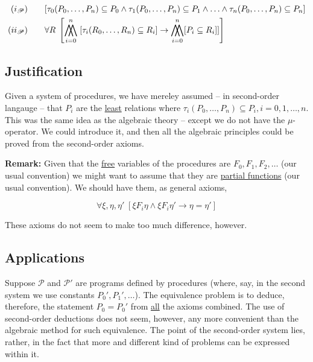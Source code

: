 \documentclass{article}
\DeclareMathOperator*{\bigdoublewedge}{\bigwedge\mkern-15mu\bigwedge}
\newcommand{\scP}{\mathscr{P}}
\begin{document}
\begin{align*}
    (i_\scP) \quad\quad & [\tau_0(P_0, \ldots, P_n) \subseteq P_0  \wedge \tau_1(P_0, \ldots, P_n) \subseteq P_1  \wedge \ldots \wedge \tau_n(P_0, \ldots, P_n) \subseteq P_n] \\
    (ii_\scP) \quad\quad &\forall R \; \left[ \bigdoublewedge\limits_{i=0}^n \; [\tau_i (R_0, \ldots, R_n) \subseteq R_i ] \to \bigdoublewedge\limits_{i=0}^n [P_i \subseteq R_i]] \right]
\end{align*}

\subsection{Justification}
Given a system of procedures, we have mereley assumed -- in second-order langauge -- that $P_i$ are the \underline{least} relations where $\tau_i(P_0, \ldots, P_n) \subseteq P_i, i=0,1,\ldots,n$. This was the same idea as the algebraic theory -- except we do not have the $\mu$-operator. We could introduce it, and then all the algebraic principles could be proved from the second-order axioms. 

\textbf{Remark:} Given that the \underline{free} variables of the procedures are $F_0, F_1, F_2, \ldots$ (our usual convention) we might want to assume that they are \underline{partial functions} (our usual convention). We should have them, as general axioms,

\begin{equation*}
    \forall \xi, \eta, \eta'\;[\xi F_i \eta \wedge \xi F_i \eta' \rightarrow \eta = \eta']
\end{equation*}

These axioms do not seem to make too much difference, however. 

\subsection{Applications}
Suppose $\scP$ and $\scP'$ are programs defined by procedures (where, say, in the second system we use constants $P_0', P_1', \ldots$). The equivalence problem is to deduce, therefore, the statement $P_0 = P_0'$ from \underline{all} the axioms combined. The use of second-order deductions does not seem, however, any more convenient than the algebraic method for such equivalence. The point of the second-order system lies, rather, in the fact that more and different kind of problems can be expressed within it. \\
\end{document}
